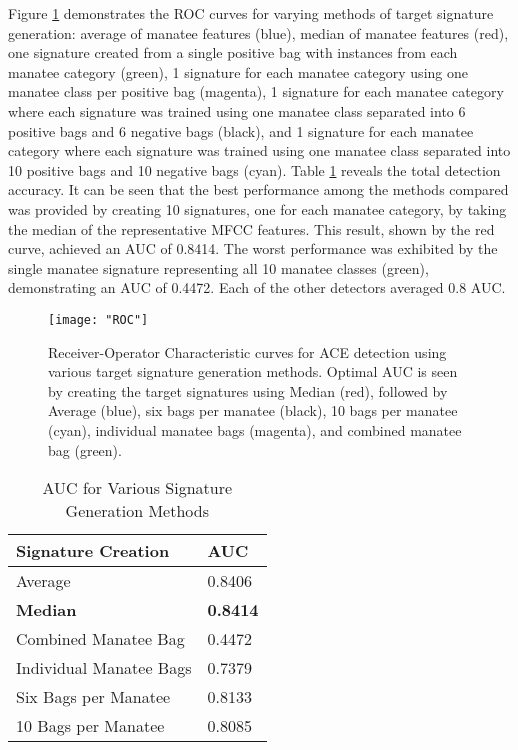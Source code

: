\documentclass[conference]{IEEEtran}
\begin{document}
Figure \ref{fig:ROC} demonstrates the ROC curves for varying methods of target signature generation: average of manatee features (blue), median of manatee features (red), one signature created from a single positive bag with instances from each manatee category (green), 1 signature for each manatee category using one manatee class per positive bag (magenta), 1 signature for each manatee category where each signature was trained using one manatee class separated into 6 positive bags and 6 negative bags (black), and 1 signature for each manatee category where each signature was trained using one manatee class separated into 10 positive bags and 10 negative bags (cyan).  Table \ref{tab:AUC} reveals the total detection accuracy.  It can be seen that the best performance among the methods compared was provided by creating 10 signatures, one for each manatee category, by taking the median of the representative MFCC features.  This result, shown by the red curve, achieved an AUC of 0.8414.  The worst performance was exhibited by the single manatee signature representing all 10 manatee classes (green), demonstrating an AUC of 0.4472. Each of the other detectors averaged 0.8 AUC.
 

\begin{center}
	\begin{figure}[h!]
		\centering
		\texttt{[image: "ROC"]}
		\caption{Receiver-Operator Characteristic curves for ACE detection using various target signature generation methods.  Optimal AUC is seen by creating the target signatures using Median (red), followed by Average (blue), six bags per manatee (black), 10 bags per manatee (cyan), individual manatee bags (magenta), and combined manatee bag (green).}
		\label{fig:ROC}
	\end{figure}
\end{center}

\begin{table}[h!]
	\caption{AUC for Various Signature Generation Methods}
	\label{tab:AUC}
	\normalsize
	\begin{center}
		\begin{tabularx}{0.5\textwidth}{ |X|X| } 
			\hline
			\textbf{Signature Creation}  & \textbf{AUC} \\
			\hline
			Average & 0.8406 \\
			\hline
			\textbf{Median} & \textbf{0.8414} \\
			\hline
			Combined Manatee Bag & 0.4472 \\
			\hline
			Individual Manatee Bags & 0.7379 \\
			\hline
			Six Bags per Manatee & 0.8133 \\
			\hline
			10 Bags per Manatee & 0.8085 \\
			\hline
		\end{tabularx}
	\end{center}
\end{table} 
\end{document}
